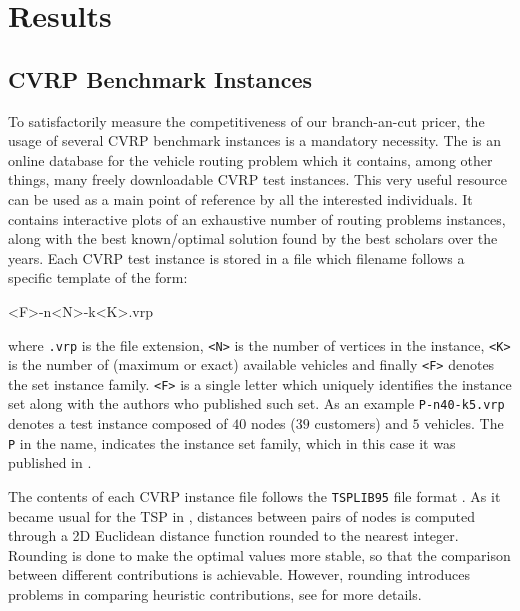 \chapter{Results}
\label{sec:results}

\section{CVRP Benchmark Instances}
\label{sec:results-benchmark-instances}
To satisfactorily measure the competitiveness of our branch-an-cut pricer,
the usage of several CVRP benchmark instances is a mandatory necessity.
The 
is an online database for the vehicle routing problem
which it contains, among other things,
many freely downloadable CVRP test instances.
This very useful resource can be used
as a main point of reference by all the interested individuals.
It contains interactive plots of an exhaustive number of routing problems instances,
along with the best known/optimal solution found by the best scholars over the years.
Each CVRP test instance is stored in a file which filename follows a specific template of the form:

\begin{center}
	\begin{LVerbatim}
		<F>-n<N>-k<K>.vrp
	\end{LVerbatim}
\end{center}

where \texttt{.vrp} is the file extension,
\texttt{<N>} is the number of vertices in the instance,
\texttt{<K>} is the number of (maximum or exact) available vehicles
and finally \texttt{<F>} denotes the set instance family.
\texttt{<F>} is a single letter which uniquely identifies the instance
set along with the authors who published such set.
As an example \texttt{P-n40-k5.vrp} denotes a test instance composed
of $40$ nodes ($39$ customers) and $5$ vehicles.
The \texttt{P} in the name, indicates the instance set family, which in this
case it was published in \textcite{augerat1995}.

The contents of each CVRP instance file follows the \texttt{TSPLIB95} file format \parencite{reinelt1995}.
As it became usual for the TSP in \textcite{reinelt1991},
distances between pairs of nodes
is computed through a 2D Euclidean distance function
rounded to the nearest integer.
Rounding is done to make the optimal values more stable, so that the comparison between different contributions is achievable.
However, rounding introduces problems in comparing heuristic contributions, see \textcite{uchoa2017} for more details.

